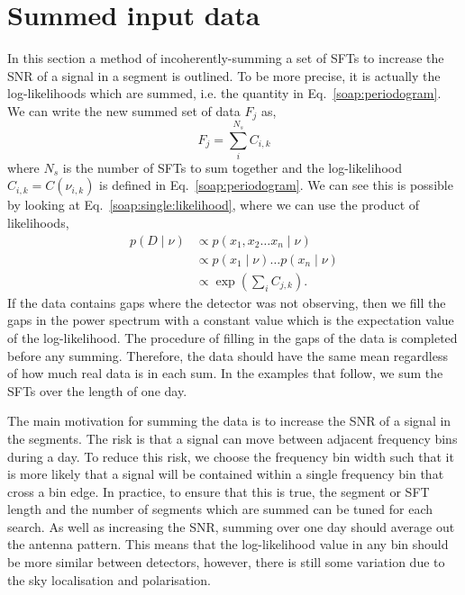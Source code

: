 \section{\label{soap:sumdata}Summed input data}
%
%
In this section a method of incoherently-summing a set of \glspl{SFT} to increase the \gls{SNR} of a signal in a segment is outlined. To be more precise, it is actually the log-likelihoods which are summed, i.e. the quantity in Eq.~\ref{soap:periodogram}. We can write the new summed set of data $F_j$ as,
%
\begin{equation}
F_j = \sum_{i}^{N_s}C_{i,k}
\end{equation}
%
where $N_s$ is the number of \glspl{SFT} to sum together and the log-likelihood $C_{i,k} = C(\nu_{i,k})$ is defined in Eq.~\ref{soap:periodogram}.
We can see this is possible by looking at Eq.~\ref{soap:single:likelihood}, where we can use the product of likelihoods,
%
\begin{equation}
\begin{split}
p(D \mid \nu) &\propto p(x_1,x_2 \ldots x_n \mid \nu) \\
&\propto p(x_1 \mid \nu) \ldots p(x_n \mid \nu) \\
&\propto \exp{\left( \sum_i C_{j,k}\right)}.
\end{split}
\end{equation}
%
If the data contains gaps where the detector was not observing, then we fill the gaps in the power spectrum with a constant value which is the expectation value of the log-likelihood. The procedure of filling in the gaps of the data is completed before any summing.  Therefore, the data should have the same mean regardless of how much real data is in each sum. In the examples that follow, we sum the \glspl{SFT} over the length of one day.

The main motivation for summing the data is to increase the \gls{SNR} of a signal in the segments. The risk is that a signal can move between adjacent frequency bins during a day. To reduce this risk, we choose the frequency bin width such that it is more likely that a signal will be contained within a single frequency bin that cross a bin edge. In practice, to ensure that this is true, the segment or \gls{SFT} length and the number of segments which are summed can be tuned for each search. As well as increasing the \gls{SNR}, summing over one day should average out the antenna pattern. This means that the log-likelihood value in any bin should be more similar between detectors, however, there is still some variation due to the sky localisation and polarisation.

